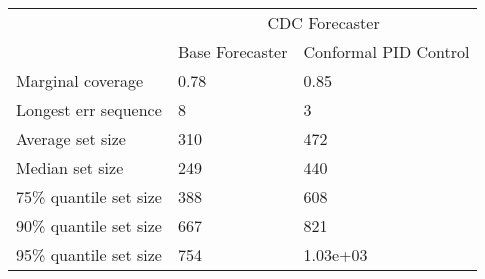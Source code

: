 \begin{tabular}{lll}
\toprule
& \multicolumn{2}{c}{CDC Forecaster} \\
& Base Forecaster & Conformal PID Control \\
\midrule
Marginal coverage & 0.78 & 0.85 \\
Longest err sequence & 8 & 3 \\
Average set size & 310 & 472 \\
Median set size & 249 & 440 \\
75\% quantile set size & 388 & 608 \\
90\% quantile set size & 667 & 821 \\
95\% quantile set size & 754 & 1.03e+03 \\
\bottomrule
\end{tabular}
